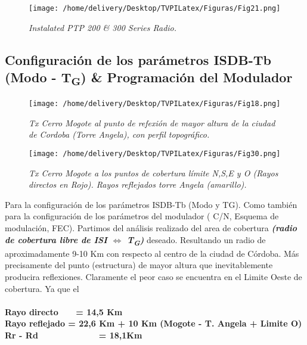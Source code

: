 \documentclass[a4paper,11pt]{article} %
\begin{document}
\begin{figure}[h!] 
\centering
\texttt{[image: /home/delivery/Desktop/TVPILatex/Figuras/Fig21.png]}
\caption{\emph{Instalated PTP 200 \& 300 Series Radio.}}
\end{figure}

\begin{center}
\color{white}{.}
\end{center}
\newpage
\begin{center}
\color{white}{.}
\end{center}
\newpage
\begin{center}
\color{white}{.}
\end{center}
\newpage

\subsection{Configuraci\'on de los par\'ametros ISDB-Tb (Modo -
T\textsubscript{G}) \& Programaci\'on del Modulador}

\begin{figure}[h!] 
\centering
\texttt{[image: /home/delivery/Desktop/TVPILatex/Figuras/Fig18.png]}
\caption{\emph{Tx Cerro Mogote al punto de refexi\'on de mayor altura
de la ciudad de Cordoba (Torre Angela), con perfil topogr\'afico.}}
\end{figure}

\begin{figure}[h!] 
\centering
\texttt{[image: /home/delivery/Desktop/TVPILatex/Figuras/Fig30.png]}
\caption{\emph{Tx Cerro Mogote a los puntos de cobertura l\'imite N,S,E
y O (Rayos directos en Rojo). Rayos reflejados torre Angela
(amarillo).}}
\end{figure}

Para la configuraci\'on de los par\'ametros ISDB-Tb (Modo y TG). Como
tambi\'en para la configuraci\'on de los par\'ametros del modulador (
C/N, Esquema de modulaci\'on, FEC). Partimos del an\'alisis realizado
del area de cobertura \textbf{\emph{(radio de cobertura libre de ISI
$\Longleftrightarrow$ T\textsubscript{G})}} deseado. Resultando un radio
de aproximadamente 9-10 Km con respecto al centro de la ciudad de
C\'ordoba. M\'as precisamente del punto (estructura) de mayor altura que
inevitablemente producira reflexiones.
Claramente el peor caso se encuentra en el Limite Oeste de
cobertura. Ya que el \\ \\ \textbf{Rayo directo \ \ \ = 14,5 Km} \\
\textbf{Rayo reflejado = 22,6 Km + 10 Km (Mogote - T. Angela + Limite
O)} \\ \textbf{Rr - Rd \ \ \ \ \ \ \ \ \ \ \ \ = 18,1Km} 
\\
\end{document}
